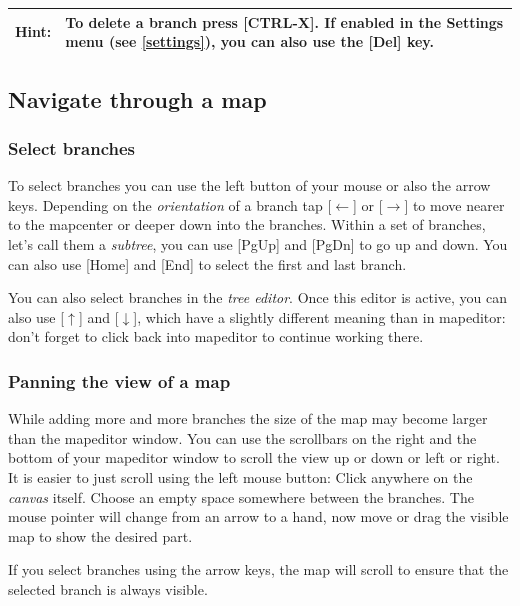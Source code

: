 \documentclass[12pt,a4paper]{article}
\newcommand{\hint}[1]{
    \begin{center} 
        \begin{tabular}{|rp{12cm}|} \hline
            {\bf Hint}:& #1\\   \hline
        \end{tabular}
            \marginpar{\Huge !} 
    \end{center} 
}
\newcommand{\ra}{$\longrightarrow$}
\newcommand{\la}{$\longleftarrow$}
\newcommand{\ua}{$\uparrow$}
\newcommand{\da}{$\downarrow$}
\newcommand{\key}[1]{[#1]}
\begin{document}
\hint{To delete a branch press \key{CTRL-X}. If enabled in the Settings
menu (see \ref{settings}), you can also use the \key{Del} key.}

\subsection{Navigate through a map}
\subsubsection*{Select branches}
To select branches you can use the left button of your mouse or also the
arrow keys. Depending on the {\em orientation} of a branch tap \key{\la}
or \key{\ra} to move nearer to the mapcenter or deeper down into the
branches. Within a set of branches, let's call them a {\em subtree}, you
can use \key{PgUp} and \key{PgDn} to go up and down. You can also use
\key{Home} and \key{End} to select the first and last branch.

You can also select branches in the {\em tree editor}. Once this editor
is active, you can also use \key{\ua} and \key {\da}, which have a
slightly different meaning than in mapeditor: don't forget to click back
into mapeditor to continue working there.

\subsubsection*{Panning the view of a map}
While adding more and more branches the size of the map may become
larger than the mapeditor window. You can use the scrollbars on the
right and the bottom of your mapeditor window to scroll the view up or
down or left or right. It is easier to just scroll using the left mouse
button: Click anywhere on the {\em canvas} itself. Choose an empty space
somewhere between the branches. The mouse pointer will change from an
arrow to a hand, now move or drag the visible map to show the desired
part.

If you select branches using the arrow keys, the map will scroll to
ensure that the selected branch is always visible.
\end{document}
